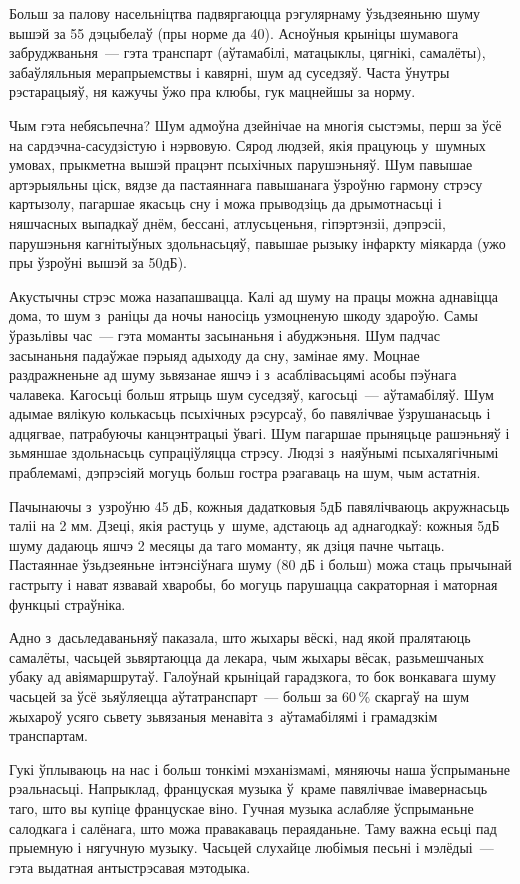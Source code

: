 Больш за палову насельніцтва падвяргаюцца рэгулярнаму ўзьдзеяньню шуму вышэй за 55 дэцыбелаў (пры норме да 40). Асноўныя крыніцы шумавога забруджваньня~--- гэта транспарт (аўтамабілі, матацыклы, цягнікі, самалёты), забаўляльныя мерапрыемствы і кавярні, шум ад суседзяў. Часта ўнутры рэстарацыяў, ня кажучы ўжо пра клюбы, гук мацнейшы за норму.

Чым гэта небясьпечна? Шум адмоўна дзейнічае на многія сыстэмы, перш за ўсё на сардэчна-сасудзістую і нэрвовую. Сярод людзей, якія працуюць у~шумных умовах, прыкметна вышэй працэнт псыхічных парушэньняў. Шум павышае артэрыяльны ціск, вядзе да пастаяннага павышанага ўзроўню гармону стрэсу картызолу, пагаршае якасьць сну і можа прыводзіць да дрымотнасьці і няшчасных выпадкаў днём, бессані, атлусьценьня, гіпэртэнзіі, дэпрэсіі, парушэньня кагнітыўных здольнасьцяў, павышае рызыку інфаркту міякарда (ужо пры ўзроўні вышэй за 50дБ).

Акустычны стрэс можа назапашвацца. Калі ад шуму на працы можна аднавіцца дома, то шум з~раніцы да ночы наносіць узмоцненую шкоду здароўю. Самы ўразьлівы час~--- гэта моманты засынаньня і абуджэньня. Шум падчас засынаньня падаўжае пэрыяд адыходу да сну, замінае яму. Моцнае раздражненьне ад шуму зьвязанае яшчэ і з~асаблівасьцямі асобы пэўнага чалавека. Кагосьці больш ятрыць шум суседзяў, кагосьці~--- аўтамабіляў. Шум адымае вялікую колькасьць псыхічных рэсурсаў, бо павялічвае ўзрушанасьць і адцягвае, патрабуючы канцэнтрацыі ўвагі. Шум пагаршае прыняцьце рашэньняў і зьмяншае здольнасьць супраціўляцца стрэсу. Людзі з~наяўнымі псыхалягічнымі праблемамі, дэпрэсіяй могуць больш гостра рэагаваць на шум, чым астатнія.

Пачынаючы з~узроўню 45 дБ, кожныя дадатковыя 5дБ павялічваюць акружнасьць таліі на 2 мм. Дзеці, якія растуць у~шуме, адстаюць ад аднагодкаў: кожныя 5дБ шуму дадаюць яшчэ 2 месяцы да таго моманту, як дзіця пачне чытаць. Пастаяннае ўзьдзеяньне інтэнсіўнага шуму (80 дБ і больш) можа стаць прычынай гастрыту і нават язвавай хваробы, бо могуць парушацца сакраторная і маторная функцыі страўніка.

Адно з~дасьледаваньняў паказала, што жыхары вёскі, над якой пралятаюць самалёты, часьцей зьвяртаюцца да лекара, чым жыхары вёсак, разьмешчаных убаку ад авіямаршрутаў. Галоўнай крыніцай гарадзкога, то бок вонкавага шуму часьцей за ўсё зьяўляецца аўтатранспарт~--- больш за 60\,\% скаргаў на шум жыхароў усяго сьвету зьвязаныя менавіта з~аўтамабілямі і грамадзкім транспартам.

Гукі ўплываюць на нас і больш тонкімі мэханізмамі, мяняючы наша ўспрыманьне рэальнасьці. Напрыклад, француская музыка ў~краме павялічвае імавернасьць таго, што вы купіце францускае віно. Гучная музыка аслабляе ўспрыманьне салодкага і салёнага, што можа правакаваць пераяданьне. Таму важна есьці пад прыемную і нягучную музыку. Часьцей слухайце любімыя песьні і мэлёдыі~--- гэта выдатная антыстрэсавая мэтодыка.

